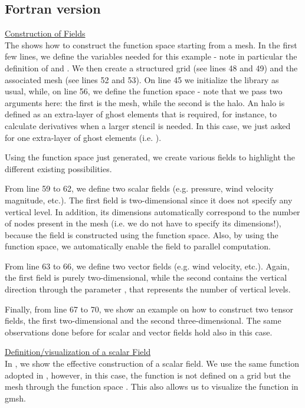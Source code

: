 \subsection{Fortran version}
%
\begin{description}
%
\item \underline{Construction of Fields}\\[0.5em]
%
The  shows how to construct the function space 
 starting from a mesh. In the first few lines, we define 
the variables needed for this example - note in particular the definition 
of  and .
We then create a structured grid (see lines 48 and 49) and the associated 
mesh (see lines 52 and 53).
On line 45 we initialize the library as usual, while, on line 56, 
we define the  function space - note that we pass two 
arguments here: the first is the mesh, while the second is the halo. 
An halo is defined as an extra-layer of ghost elements that is required, 
for instance, to calculate derivatives when a larger stencil is needed. 
In this case, we just asked for one extra-layer of ghost elements (i.e. 
). 

Using the function space  just generated, we create 
various fields to highlight the different existing possibilities.

From line 59 to 62, we define two scalar fields (e.g. pressure, 
wind velocity magnitude, etc.). The first field is two-dimensional 
since it does not specify any vertical level. In addition, its 
dimensions automatically correspond to the number of nodes present 
in the mesh (i.e. we do not have to specify its dimensions!), because 
the field is constructed using the function space. Also, by using the 
function space, we automatically enable the field to parallel computation.

From line 63 to 66,  we define two vector fields (e.g. wind 
velocity, etc.). Again, the first field is purely two-dimensional, 
while the second contains the vertical direction through the parameter 
, that represents the number of vertical levels. 

Finally, from line 67 to 70, we show an example on how to construct 
two tensor fields, the first two-dimensional and the second three-dimensional. 
The same observations done before for scalar and vector fields hold 
also in this case.
%

%
%
\item \underline{Definition/visualization of a scalar Field}\\[0.5em]
%
%
In , we show the effective construction 
of a scalar field. We use the same function adopted in , 
however, in this case, the function is not defined on a grid but 
the mesh through the function space . This also allows 
us to visualize the function in gmsh.


\end{description}

